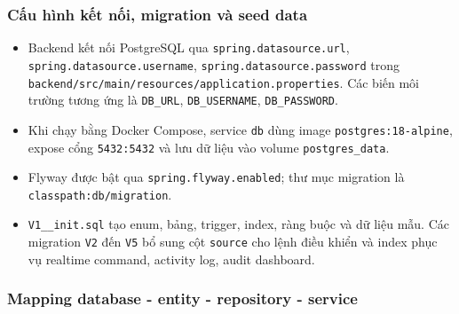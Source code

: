 \subsubsection{Cấu hình kết nối, migration và seed data}

\begin{itemize}
    \item Backend kết nối PostgreSQL qua \texttt{spring.datasource.url}, \texttt{spring.datasource.username}, \texttt{spring.datasource.password} trong \texttt{backend/src/main/resources/application.properties}. Các biến môi trường tương ứng là \texttt{DB\_URL}, \texttt{DB\_USERNAME}, \texttt{DB\_PASSWORD}.
    \item Khi chạy bằng Docker Compose, service \texttt{db} dùng image \texttt{postgres:18-alpine}, expose cổng \texttt{5432:5432} và lưu dữ liệu vào volume \texttt{postgres\_data}.
    \item Flyway được bật qua \texttt{spring.flyway.enabled}; thư mục migration là \texttt{classpath:db/migration}.
    \item \texttt{V1\_\_init.sql} tạo enum, bảng, trigger, index, ràng buộc và dữ liệu mẫu. Các migration \texttt{V2} đến \texttt{V5} bổ sung cột \texttt{source} cho lệnh điều khiển và index phục vụ realtime command, activity log, audit dashboard.
\end{itemize}

\subsubsection{Mapping database - entity - repository - service}

